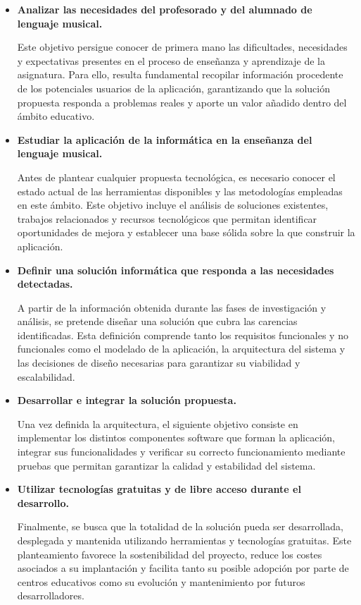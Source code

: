 \begin{itemize}

\item \textbf{Analizar las necesidades del profesorado y del alumnado de lenguaje musical.}

Este objetivo persigue conocer de primera mano las dificultades, necesidades y expectativas presentes en el proceso de enseñanza y aprendizaje de la asignatura. Para ello, resulta fundamental recopilar información procedente de los potenciales usuarios de la aplicación, garantizando que la solución propuesta responda a problemas reales y aporte un valor añadido dentro del ámbito educativo.

\item \textbf{Estudiar la aplicación de la informática en la enseñanza del lenguaje musical.}

Antes de plantear cualquier propuesta tecnológica, es necesario conocer el estado actual de las herramientas disponibles y las metodologías empleadas en este ámbito. Este objetivo incluye el análisis de soluciones existentes, trabajos relacionados y recursos tecnológicos que permitan identificar oportunidades de mejora y establecer una base sólida sobre la que construir la aplicación.

\item \textbf{Definir una solución informática que responda a las necesidades detectadas.}

A partir de la información obtenida durante las fases de investigación y análisis, se pretende diseñar una solución que cubra las carencias identificadas. Esta definición comprende tanto los requisitos funcionales y no funcionales como el modelado de la aplicación, la arquitectura del sistema y las decisiones de diseño necesarias para garantizar su viabilidad y escalabilidad.

\item \textbf{Desarrollar e integrar la solución propuesta.}

Una vez definida la arquitectura, el siguiente objetivo consiste en implementar los distintos componentes software que forman la aplicación, integrar sus funcionalidades y verificar su correcto funcionamiento mediante pruebas que permitan garantizar la calidad y estabilidad del sistema.

\item \textbf{Utilizar tecnologías gratuitas y de libre acceso durante el desarrollo.}

Finalmente, se busca que la totalidad de la solución pueda ser desarrollada, desplegada y mantenida utilizando herramientas y tecnologías gratuitas. Este planteamiento favorece la sostenibilidad del proyecto, reduce los costes asociados a su implantación y facilita tanto su posible adopción por parte de centros educativos como su evolución y mantenimiento por futuros desarrolladores.

\end{itemize}

